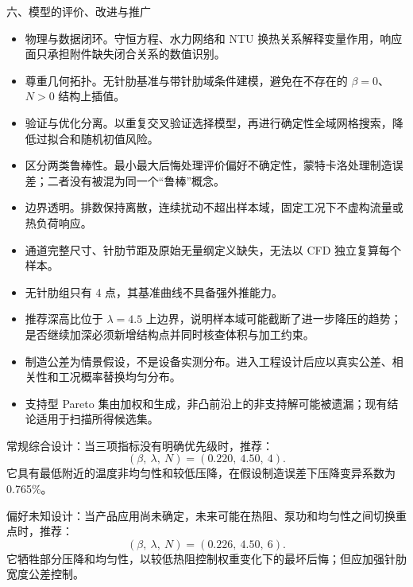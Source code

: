 \documentclass[12pt]{article}
\newcommand{\sect}[1]{\par\vspace{12pt}\noindent\begin{center}{\fontsize{14pt}{20pt}\selectfont\hei #1}\end{center}\vspace{4pt}}
\newcommand{\subsect}[1]{\par\vspace{6pt}\noindent{\fontsize{12pt}{17pt}\selectfont\hei #1}\par\vspace{2pt}}
\begin{document}
\sect{六、模型的评价、改进与推广}
\subsect{6.1\quad 模型优点}
\begin{itemize}[leftmargin=2.5em,itemsep=0pt]
  \item 物理与数据闭环。守恒方程、水力网络和 NTU 换热关系解释变量作用，响应面只承担附件缺失闭合关系的数值识别。
  \item 尊重几何拓扑。无针肋基准与带针肋域条件建模，避免在不存在的 $\beta = 0$、$N > 0$ 结构上插值。
  \item 验证与优化分离。以重复交叉验证选择模型，再进行确定性全域网格搜索，降低过拟合和随机初值风险。
  \item 区分两类鲁棒性。最小最大后悔处理评价偏好不确定性，蒙特卡洛处理制造误差；二者没有被混为同一个``鲁棒''概念。
  \item 边界透明。排数保持离散，连续扰动不超出样本域，固定工况下不虚构流量或热负荷响应。
\end{itemize}
\subsect{6.2\quad 模型局限}
\begin{itemize}[leftmargin=2.5em,itemsep=0pt]
  \item 通道完整尺寸、针肋节距及原始无量纲定义缺失，无法以 CFD 独立复算每个样本。
  \item 无针肋组只有 4 点，其基准曲线不具备强外推能力。
  \item 推荐深高比位于 $\lambda = 4.5$ 上边界，说明样本域可能截断了进一步降压的趋势；是否继续加深必须新增结构点并同时核查体积与加工约束。
  \item 制造公差为情景假设，不是设备实测分布。进入工程设计后应以真实公差、相关性和工况概率替换均匀分布。
  \item 支持型 Pareto 集由加权和生成，非凸前沿上的非支持解可能被遗漏；现有结论适用于扫描所得候选集。
\end{itemize}
\subsect{6.3\quad 分层推荐}
常规综合设计：当三项指标没有明确优先级时，推荐：
\begin{equation}
  (\beta,\ \lambda,\ N) = (0.220,\ 4.50,\ 4).
  \label{eq:52}
\end{equation}
它具有最低附近的温度非均匀性和较低压降，在假设制造误差下压降变异系数为 0.765\%。

偏好未知设计：当产品应用尚未确定，未来可能在热阻、泵功和均匀性之间切换重点时，推荐：
\begin{equation}
  (\beta,\ \lambda,\ N) = (0.226,\ 4.50,\ 6).
  \label{eq:53}
\end{equation}
它牺牲部分压降和均匀性，以较低热阻控制权重变化下的最坏后悔；但应加强针肋宽度公差控制。
\end{document}
